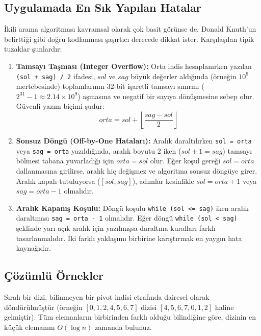 \subsection{Uygulamada En Sık Yapılan Hatalar}

İkili arama algoritması kavramsal olarak çok basit görünse de, Donald Knuth'un belirttiği gibi doğru kodlanması şaşırtıcı derecede dikkat ister. Karşılaşılan tipik tuzaklar şunlardır:

\begin{enumerate}
    \item \textbf{Tamsayı Taşması (Integer Overflow):}
    Orta indis hesaplanırken yazılan \texttt{(sol + sag) / 2} ifadesi, $sol$ ve $sag$ büyük değerler aldığında (örneğin $10^9$ mertebesinde) toplamlarının $32$-bit işaretli tamsayı sınırını ($2^{31}-1 \approx 2.14 \times 10^9$) aşmasına ve negatif bir sayıya dönüşmesine sebep olur.
    Güvenli yazım biçimi şudur:
    \[ orta = sol + \left\lfloor \frac{sag - sol}{2} \right\rfloor \]

    \item \textbf{Sonsuz Döngü (Off-by-One Hataları):}
    Aralık daraltılırken \texttt{sol = orta} veya \texttt{sag = orta} yazıldığında, aralık boyutu $2$ iken ($sol + 1 = sag$) tamsayı bölmesi tabana yuvarladığı için $orta = sol$ olur. Eğer koşul gereği $sol = orta$ dallanmasına girilirse, aralık hiç değişmez ve algoritma sonsuz döngüye girer.
    Aralık kapalı tutuluyorsa ($[sol, sag]$), adımlar kesinlikle $sol = orta + 1$ veya $sag = orta - 1$ olmalıdır.

    \item \textbf{Aralık Kapanış Koşulu:}
    Döngü koşulu \texttt{while (sol <= sag)} iken aralık daraltması \texttt{sag = orta - 1} olmalıdır. Eğer döngü \texttt{while (sol < sag)} şeklinde yarı-açık aralık için yazılmışsa daraltma kuralları farklı tasarlanmalıdır. İki farklı yaklaşımı birbirine karıştırmak en yaygın hata kaynağıdır.
\end{enumerate}

\subsection{Çözümlü Örnekler}

\begin{example}
Sıralı bir dizi, bilinmeyen bir pivot indisi etrafında dairesel olarak döndürülmüştür (örneğin $[0, 1, 2, 4, 5, 6, 7]$ dizisi $[4, 5, 6, 7, 0, 1, 2]$ haline gelmiştir). Tüm elemanların birbirinden farklı olduğu bilindiğine göre, dizinin en küçük elemanını $O(\log n)$ zamanda bulunuz.
\end{example}

